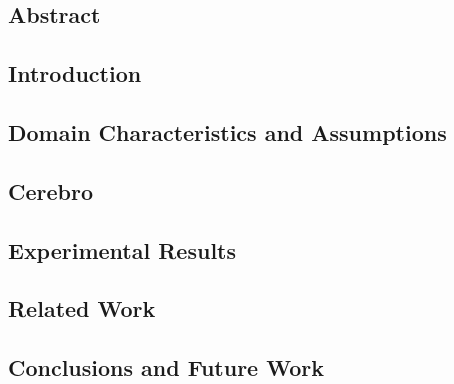 \subsection{Abstract}


\subsection{Introduction}
\label{sec:cerbro_intro}


\subsection{Domain Characteristics and Assumptions}
\label{sec:cerebro_approach}



\subsection{Cerebro}
\label{sec:cerebro_design}


\subsection{Experimental Results}
\label{sec:cerebro_results}


\subsection{Related Work}
\label{sec:cerebro_related_work}


\subsection{Conclusions and Future Work}
\label{sec:cerebro_conclusions}

